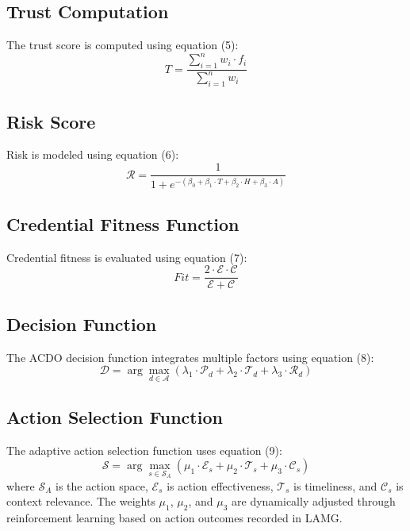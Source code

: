 \documentclass[12pt]{article}
\begin{document}
\subsection{Trust Computation}
The trust score is computed using equation (5):
\begin{equation}
    T = \frac{\sum_{i=1}^{n} w_i \cdot f_i}{\sum_{i=1}^{n} w_i}
    \label{eq:trust_computation}
\end{equation}

\subsection{Risk Score}
Risk is modeled using equation (6):
\begin{equation}
    \mathcal{R} = \frac{1}{1 + e^{-(\beta_0 + \beta_1 \cdot T + \beta_2 \cdot H + \beta_3 \cdot A)}}
    \label{eq:risk}
\end{equation}

\subsection{Credential Fitness Function}
Credential fitness is evaluated using equation (7):
\begin{equation}
    Fit = \frac{2 \cdot \mathcal{E} \cdot \mathcal{C}}{\mathcal{E} + \mathcal{C}}
    \label{eq:fitness}
\end{equation}

\subsection{Decision Function}
The ACDO decision function integrates multiple factors using equation (8):
\begin{equation}
    \mathcal{D} = \arg\max_{d \in \mathcal{A}} \left( \lambda_1 \cdot \mathcal{P}_d + \lambda_2 \cdot \mathcal{T}_d + \lambda_3 \cdot \mathcal{R}_d \right)
    \label{eq:decision}
\end{equation}

\subsection{Action Selection Function}
The adaptive action selection function uses equation (9):
\begin{equation}
    \mathcal{S} = \arg\max_{s \in \mathcal{S}_A} \left( \mu_1 \cdot \mathcal{E}_s + \mu_2 \cdot \mathcal{T}_s + \mu_3 \cdot \mathcal{C}_s \right)
    \label{eq:action_selection}
\end{equation}
where \(\mathcal{S}_A\) is the action space, \(\mathcal{E}_s\) is action effectiveness, \(\mathcal{T}_s\) is timeliness, and \(\mathcal{C}_s\) is context relevance. The weights \(\mu_1\), \(\mu_2\), and \(\mu_3\) are dynamically adjusted through reinforcement learning based on action outcomes recorded in LAMG.
\end{document}
